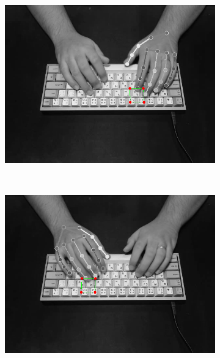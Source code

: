 \documentclass{report}
\begin{document}
\begin{figure}[H]
	\centering
	\begin{subfigure}{.5\textwidth}
		\centering
		\includegraphics[width=.995\linewidth]{failure-3.png}
	\end{subfigure}\\
	\begin{subfigure}{.5\textwidth}
		\centering
		\includegraphics[width=.995\linewidth]{failure-1.png}
	\end{subfigure}%
	\begin{subfigure}{.5\textwidth}
		\centering

\end{subfigure}
\end{figure}
\end{document}
